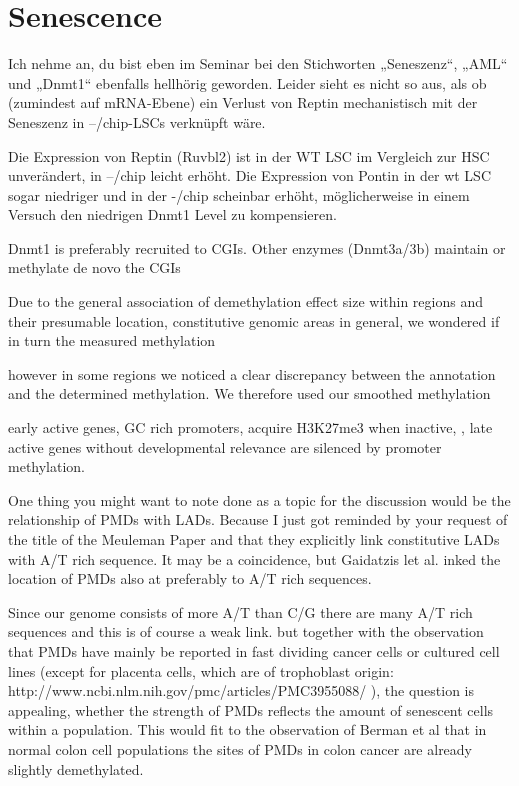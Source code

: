 \chapter{Senescence}
\minitoc

Ich nehme an, du bist eben im Seminar bei den Stichworten „Seneszenz“, „AML“ und „Dnmt1“ ebenfalls hellhörig geworden. Leider sieht es nicht so aus, als ob (zumindest auf mRNA-Ebene) ein Verlust von Reptin mechanistisch mit der Seneszenz in –/chip-LSCs verknüpft wäre. 

Die Expression von Reptin (Ruvbl2) ist in der WT LSC im Vergleich zur HSC unverändert, in –/chip leicht erhöht. Die Expression von Pontin in der wt LSC sogar niedriger und in der -/chip scheinbar erhöht, möglicherweise in einem Versuch den niedrigen Dnmt1 Level zu kompensieren. 



Dnmt1 is preferably recruited to CGIs.
Other enzymes (Dnmt3a/3b) maintain or methylate de novo the CGIs

Due to the general association of demethylation effect size within regions and their presumable location, constitutive genomic areas in general, we wondered if in turn the measured methylation 

however in some regions we noticed a clear discrepancy between the annotation and the determined methylation. We therefore used our smoothed methylation 

early active genes, GC rich promoters, acquire H3K27me3 when inactive, \cite{Xie2013}, late active genes without developmental relevance are silenced by promoter methylation. 

One thing you might want to note done as a topic for the discussion would be the relationship of PMDs with LADs. Because I just got reminded by your request of the title of the Meuleman Paper and that they explicitly link constitutive LADs with A/T rich sequence. It may be a coincidence, but Gaidatzis let al. inked the location of PMDs also at preferably to A/T rich sequences. 

Since our genome consists of more A/T than C/G there are many A/T rich sequences and this is of course a weak link. but together with the observation that PMDs have mainly be reported in fast dividing cancer cells or cultured cell lines (except for placenta cells, which are of trophoblast origin: http://www.ncbi.nlm.nih.gov/pmc/articles/PMC3955088/ ), the question is appealing, whether the strength of PMDs reflects the amount of senescent cells within a population. This would fit to the observation of Berman et al that in normal colon cell populations the sites of PMDs in colon cancer are already slightly demethylated. 

